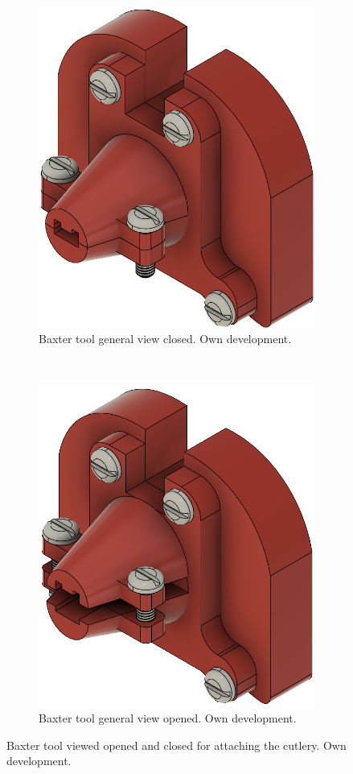\documentclass[11pt]{report} %
\begin{document}
\begin{figure}[H]
	\centering
	\begin{subfigure}{.5\textwidth}
		\centering
		\includegraphics[width=0.65\linewidth]{assets/imgs/baxter_robot/baxter_spoon_fusion_side_view_closed.png}
		\caption{Baxter tool general view closed. Own development.}
		\label{fig_general_view_baxter_tool_closed}
	\end{subfigure}~
	\begin{subfigure}{.5\textwidth}
		\centering
		\includegraphics[width=0.65\linewidth]{assets/imgs/baxter_robot/baxter_spoon_fusion_side_view_opened.png}
		\caption{Baxter tool general view opened. Own development.}
		\label{fig_general_view_baxter_tool_opened}
	\end{subfigure}%
	\caption{Baxter tool viewed opened and closed for attaching the cutlery. Own development.}
	\label{fig_baxter_tool_fusion_multiple_views}
\end{figure}
\end{document}
